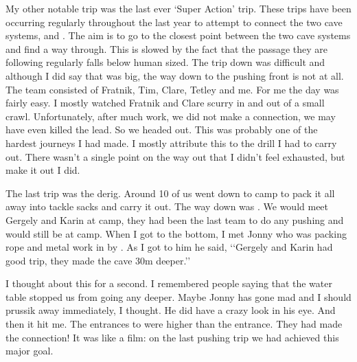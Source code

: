 My other notable trip was the last ever ‘Super Action’ trip. These trips have been occurring regularly throughout the last year to attempt to connect the two cave systems,  and . The aim is to go to the closest point between the two cave systems and find a way through. This is slowed by the fact that the passage they are following regularly falls below human sized. The trip down was difficult and although I did say that  was big, the way down to the pushing front is not at all. The team consisted of Fratnik, Tim, Clare, Tetley and me. For me the day was fairly easy. I mostly watched Fratnik and Clare scurry in and out of a small crawl. Unfortunately, after much work, we did not make a connection, we may have even killed the lead. So we headed out. This was probably one of the hardest journeys I had made. I mostly attribute this to the drill I had to carry out. There wasn’t a single point on the way out that I didn’t feel exhausted, but make it out I did.

The last trip was the derig. Around 10 of us went down to camp to pack it all away into tackle sacks and carry it out. The way down was . We would meet Gergely and Karin at camp, they had been the last team to do any pushing and would still be at camp. When I got to the bottom, I met Jonny who was packing rope and metal work in by . As I got to him he said, ‘‘Gergely and Karin had good trip, they made the cave 30m deeper.’’

I thought about this for a second. I remembered people saying that the water table stopped us from going any deeper. Maybe Jonny has gone mad and I should prussik away immediately, I thought. He did have a crazy look in his eye. And then it hit me. The entrances to  were higher than the  entrance. They had made the connection! It was like a film: on the last pushing trip we had achieved this major goal.

